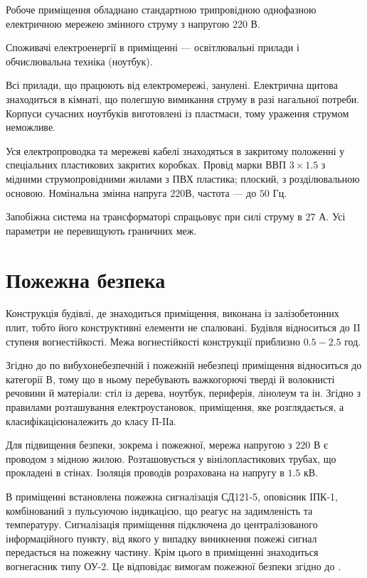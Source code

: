 Робоче приміщення обладнано стандартною трипровідною однофазною електричною
мережею змінного струму з напругою 220 В.

Споживачі електроенергії в приміщенні --- освітлювальні прилади
і обчислювальна техніка (ноутбук).

Всі прилади, що працюють від електромережі, занулені.
Електрична щитова знаходиться в кімнаті,
що полегшую вимикання струму в разі нагальної потреби.
Корпуси сучасних ноутбуків виготовлені із пластмаси,
тому ураження струмом неможливе.

Уся електропроводка та мережеві кабелі знаходяться в закритому положенні
у спеціальних пластикових закритих коробках.
Провід марки ВВП $3\times 1.5$ з мідними струмопровідними жилами з ПВХ пластика;
плоский, з розділювальною основою.
Номінальна змінна напруга $220$В, частота --- до $50$ Гц.

Запобіжна система на трансформаторі спрацьовує при силі струму в $27$ А.
Усі параметри не перевищують граничних меж.

\section{Пожежна безпека}

Конструкція будівлі, де знаходиться приміщення, виконана із залізобетонних плит,
тобто його конструктивні елементи не спалювані.
Будівля відноситься до II ступеня вогнестійкості.
Межа вогнестійкості конструкції приблизно $0.5 - 2.5$ год.

Згідно до \cite{ONTP} по вибухонебезпечній і пожежній небезпеці приміщення
відноситься до категорії В, тому що в ньому перебувають важкогорючі тверді
й волокнисті речовини й матеріали: стіл із дерева, ноутбук, периферія, лінолеум
та ін.
Згідно з правилами розташування електроустановок, приміщення, яке розглядається,
а класифікацієюналежить до класу П-IІа.

Для підвищення безпеки, зокрема і пожежної, мережа напругою з $220$ В
є проводом з мідною жилою.
Розташовується у вінілопластикових трубах, що прокладені в стінах.
Ізоляція проводів розрахована на напругу в $1.5$ кВ. 

В приміщенні встановлена пожежна сигналізація СД121-5, оповісник ІПК-1,
комбінований з пульсуючою індикацією, що реагує на задимленість та температуру.
Сигналізація приміщення підключена до централізованого інформаційного пункту,
від якого у випадку виникнення пожежі сигнал передається на пожежну частину.
Крім цього в приміщенні знаходиться вогнегасник типу ОУ-2.
Це відповідає вимогам пожежної безпеки згідно до \cite{PPBU}.

